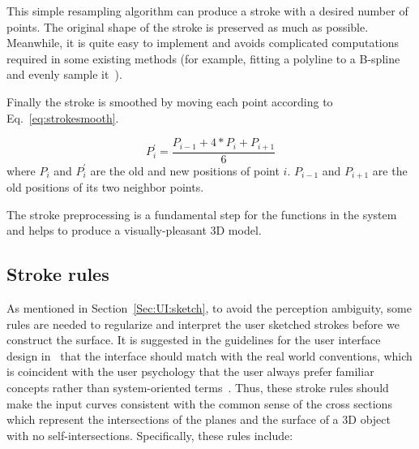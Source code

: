 This simple resampling algorithm can produce a stroke with a desired
number of points. The original shape of the stroke is preserved as
much as possible. Meanwhile, it is quite easy to implement and
avoids complicated computations required in some existing methods
(for example, fitting a polyline to a B-spline and evenly sample
it~\cite{CMZHB99}).

Finally the stroke is smoothed by moving each point according to Eq.~\ref{eq:strokesmooth}.

\begin{equation}
\label{eq:strokesmooth}
    P_i^\prime = \frac{P_{i-1}+4*P_i+P_{i+1}}{6}
\end{equation}
where $P_i$ and $P_i^\prime$ are the old and new positions of point
$i$. $P_{i-1}$ and $P_{i+1}$ are the old positions of its two
neighbor points.

The stroke preprocessing is a fundamental step for the functions in
the system and helps to produce a visually-pleasant 3D model.


\subsection{Stroke rules}
\label{ch3:sec:algo:rule}

As mentioned in Section~\ref{Sec:UI:sketch}, to avoid the
perception ambiguity, some rules are needed to regularize and
interpret the user sketched strokes before we construct the surface.
It is suggested in the guidelines for the user interface design
in~\cite{MN90} that the interface should match with the real world
conventions, which is coincident with the user psychology that the
user always prefer familiar concepts rather than system-oriented
terms~\cite{GC87,DA06}. Thus, these stroke rules should make the
input curves consistent with the common sense of the cross sections
which represent the intersections of the planes and the surface
of a 3D object with no self-intersections. Specifically, these
rules include:

